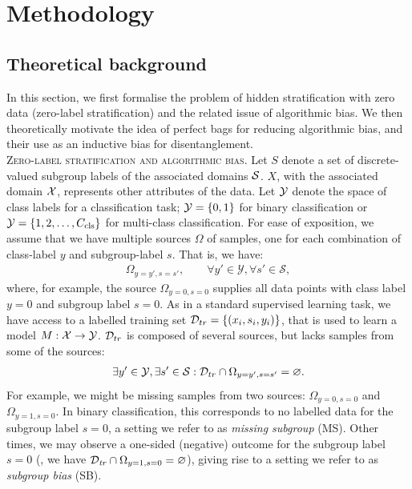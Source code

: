 \section{Methodology}\label{sec:methodology}
\subsection{Theoretical background}
In this section, we first formalise the problem of hidden stratification with zero data (zero-label stratification) and the related issue of algorithmic bias. 
%
We then theoretically motivate the idea of perfect bags for reducing algorithmic bias, and their use as an inductive bias for disentanglement.\\

\noindent\textsc{Zero-label stratification and algorithmic bias.}
\;\; Let $S$ denote a set of discrete-valued subgroup labels of the associated domains ${\mathcal{S}}$.
%
%
$X$, with the associated domain ${\mathcal{X}}$, represents other attributes of the data. %
%
Let ${\mathcal{Y}}$ denote the space of class labels for a classification task; ${\mathcal{Y}} = \{0,1\}$ for binary classification or ${\mathcal{Y}} = \{1,2,\ldots,C_{\text{cls}}\}$ for multi-class classification.
%
For ease of exposition, we assume that we have multiple sources $\Omega$ of samples, one for each combination of class-label $y$ and subgroup-label $s$.
That is, we have:
\begin{align}
\Omega_{y=y',s=s'},\quad\quad\forall y'\in\mathcal{Y},\forall s'\in\mathcal{S},
\end{align}
where, for example, the source $\Omega_{y=0,s=0}$ supplies all data points with class label $y=0$ and subgroup label $s=0$. 
%
As in a standard supervised learning task, we have access to a labelled training set ${\mathcal{D}}_{tr} =\{(x_i, s_i, y_i)\}$, that is used to learn a model $M:{\mathcal{X}} \rightarrow {\mathcal{Y}}$. 
${\mathcal{D}}_{tr}$ is composed of several sources, but lacks samples from some of the sources:
\begin{align}
\exists y'\in {\mathcal{Y}},\exists s'\in {\mathcal{S}}: {\mathcal{D}}_{tr}\cap \Omega_{y=y',s=s'} = \varnothing.
\end{align}
For example, we might be missing samples from two sources: $\Omega_{y=0,s=0}$ and $\Omega_{y=1,s=0}$. 
%
In binary classification, this corresponds to no labelled data for the subgroup label $s=0$, a setting we refer to as \emph{missing subgroup} (MS).
%
Other times, we may observe a one-sided (negative) outcome for the subgroup label $s=0$
(\ie, we have ${\mathcal{D}}_\mathit{tr} \cap\Omega_{y=1,s=0} = \varnothing$), giving rise to a setting we refer to as \emph{subgroup bias} (SB).

